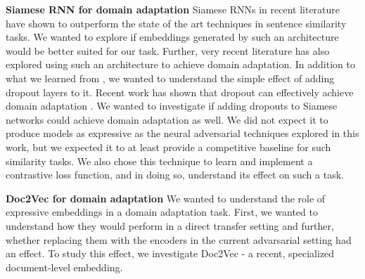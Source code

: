 \documentclass{sigkddExp}
\begin{document}
\textbf{Siamese RNN for domain adaptation} Siamese RNNs in recent literature have shown to outperform the state of the art techniques in sentence similarity tasks. We wanted to explore if embeddings generated by such an architecture would be better suited for our task. Further, very recent literature\cite{siamese_adapt} has also explored using such an architecture to achieve domain adaptation. In addition to what we learned from \cite{siamese_adapt}, we wanted to understand the simple effect of adding dropout layers to it. Recent work has shown that dropout can effectively achieve domain adaptation \cite{dropout}. We wanted to investigate if adding dropouts to Siamese networks could achieve domain adaptation as well. We did not expect it to produce models as expressive as the neural adversarial techniques explored in this work, but we expected it to at least provide a competitive baseline for such similarity tasks. We also chose this technique to learn and implement a contrastive loss function, and in doing so, understand its effect on such a task.

\textbf{\textsf{Doc2Vec} for domain adaptation} We wanted to understand the role of expressive embeddings in a domain adaptation task. First, we wanted to understand how they would perform in a direct transfer setting and further, whether replacing them with the encoders in the current advarsarial setting had an effect. To study this effect, we investigate \textsf{Doc2Vec} - a recent, specialized document-level embedding.
\end{document}
